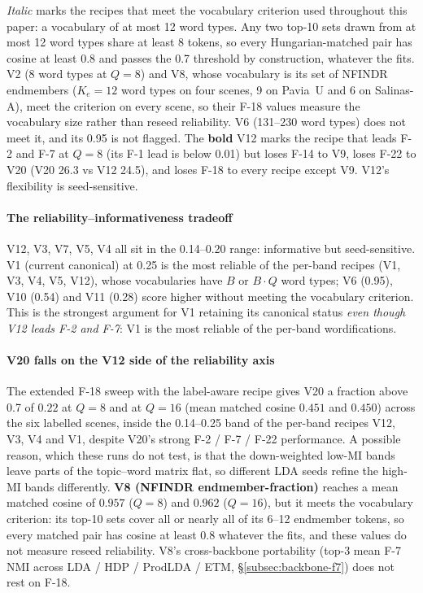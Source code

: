 \documentclass[journal,a4paper,10pt]{IEEEtran}
\begin{document}
\emph{Italic} marks the recipes that meet the vocabulary criterion used
throughout this paper: a vocabulary of at most 12 word types. Any two
top-10 sets drawn from at most 12 word types share at least 8 tokens,
so every Hungarian-matched pair has cosine at least 0.8 and passes the
0.7 threshold by construction, whatever the fits. V2 (8 word types at
$Q=8$) and V8, whose vocabulary is its set of NFINDR endmembers
($K_e = 12$ word types on four scenes, 9 on Pavia~U and 6 on
Salinas-A), meet the criterion on every scene, so their F-18 values
measure the vocabulary size rather than reseed reliability. V6
(131--230 word types) does not meet it, and its 0.95 is not flagged.
The \textbf{bold} V12 marks
the recipe that leads F-2 and F-7 at $Q=8$ (its F-1 lead is below
0.01) but loses F-14 to V9, loses F-22 to V20 (V20 26.3 vs V12 24.5),
and loses F-18 to every recipe except V9. V12's flexibility is
seed-sensitive.

\paragraph{The reliability--informativeness tradeoff}
V12, V3, V7, V5, V4 all sit in the 0.14--0.20 range: informative
but seed-sensitive. V1 (current canonical) at 0.25 is the most
reliable of the per-band recipes (V1, V3, V4, V5, V12), whose
vocabularies have $B$ or $B \cdot Q$ word types; V6 (0.95), V10 (0.54)
and V11 (0.28) score higher without meeting the vocabulary criterion.
This is the strongest argument for V1 retaining
its canonical status \emph{even though V12 leads F-2 and F-7}: V1 is
the most reliable of the per-band wordifications.

\paragraph{V20 falls on the V12 side of the reliability axis}
The extended F-18 sweep with the label-aware recipe gives V20 a
fraction above 0.7 of $0.22$ at $Q=8$ and at $Q=16$ (mean matched
cosine $0.451$ and $0.450$) across the six labelled scenes, inside the
0.14--0.25 band of the per-band recipes V12, V3, V4 and V1, despite
V20's strong F-2 / F-7 / F-22 performance. A possible reason, which
these runs do not test, is that the down-weighted low-MI bands leave
parts of the topic--word matrix flat, so different LDA seeds refine the
high-MI bands differently. \textbf{V8 (NFINDR endmember-fraction)}
reaches a mean matched cosine of $0.957$ ($Q=8$) and $0.962$ ($Q=16$),
but it meets the vocabulary criterion: its top-10 sets cover all or
nearly all of its 6--12 endmember tokens, so every matched pair has
cosine at least 0.8 whatever the fits, and these values do not measure
reseed reliability.
V8's cross-backbone portability (top-3 mean F-7 NMI across LDA / HDP /
ProdLDA / ETM, \S\ref{subsec:backbone-f7}) does not rest on F-18.
\end{document}
